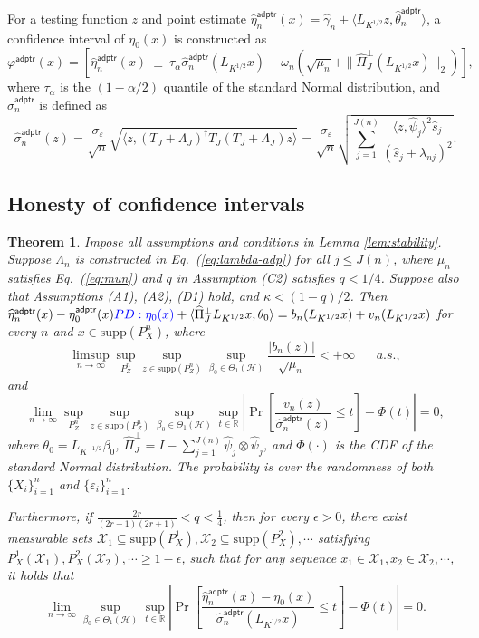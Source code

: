 \documentclass[11pt,a4paper]{article}
\renewcommand{\hat}{\widehat}
\theoremstyle{definition}
\theoremstyle{plain}
\newtheorem{theorem}{Theorem}[section]
\theoremstyle{remark}
\newcommand{\supp}{\mathrm{supp}}
\newcommand{\mX}{\mathcal X}
\newcommand{\mH}{\mathcal H}
\newcommand{\adptr}{\mathsf{adptr}}
\newcommand{\pd}[1]{
	{ \color{blue} PD: #1}
}
\begin{document}
For a testing function $z$ and point estimate $\hat\eta_n^\adptr(x)=\hat\gamma_n+\langle L_{K^{1/2}}z,\hat\theta_n^\adptr\rangle$, a confidence interval of $\eta_0(x)$ is constructed as
$$
\varphi^\adptr(x) = [\hat\eta_n^\adptr(x)\;\pm\;\tau_{\alpha}\hat\sigma_n^\adptr(L_{K^{1/2}}x)+\omega_n(\sqrt{\mu_n}+\|\hat\Pi_J^\perp(L_{K^{1/2}}x)\|_2)],
$$
where $\tau_{\alpha}$ is the $(1-\alpha/2)$ quantile of the standard Normal distribution, and $\hat\sigma_n^\adptr$ is defined as
$$
\hat\sigma_n^\adptr(z) =  \frac{\sigma_\varepsilon}{\sqrt{n}}\sqrt{\langle z, (T_J+\Lambda_J)^\dagger T_J(T_J+\Lambda_J)z\rangle} = \frac{\sigma_\varepsilon}{\sqrt{n}}\sqrt{\sum_{j=1}^{J(n)}\frac{\langle z,\hat\psi_j\rangle^2\hat s_j}{(\hat s_j+\lambda_{nj})^2}}.
$$

\subsection{Honesty of confidence intervals}

\begin{theorem}
Impose all assumptions and conditions in Lemma \ref{lem:stability}. Suppose $\Lambda_n$ is constructed in Eq.~(\ref{eq:lambda-adp}) for all $j\leq J(n)$,
where $\mu_n$ satisfies Eq.~(\ref{eq:mun}) and $q$ in Assumption (C2) satisfies $q<1/4$. Suppose also that Assumptions (A1), (A2), (D1) hold, and $\kappa<(1-q)/2$. Then 
$\hat\eta_n^\adptr(x)-\eta_0^\adptr(x) \pd{\eta_0(x)}+\langle\hat\Pi_J^\perp L_{K^{1/2}}x,\theta_0\rangle = b_n(L_{K^{1/2}}x)+v_n(L_{K^{1/2}}x)$ for every $n$ and $x\in\supp(P_X^n)$, where
$$
\limsup_{n\to\infty}\sup_{P_Z^n}\sup_{z\in\supp(P_Z^n)}\sup_{\beta_0\in\Theta_1(\mH)} \frac{|b_n(z)|}{\sqrt{\mu_n}} < +\infty\;\;\;\;\;\;a.s.,
$$
and
$$
\lim_{n\to\infty} \sup_{P_Z^n}\sup_{z\in\supp(P_Z^n)}\sup_{\beta_0\in\Theta_1(\mH)}\sup_{t\in\mathbb R}\left|\Pr\left[\frac{v_n(z)}{\hat\sigma_n^\adptr(z)}\leq t\right] - \Phi(t)\right| = 0,
$$
where $\theta_0=L_{K^{-1/2}}\beta_0$, $\hat\Pi_J^\perp = I - \sum_{j=1}^{J(n)}\hat\psi_j\otimes\hat\psi_j$, and $\Phi(\cdot)$ is the CDF of the standard Normal distribution.
The probability is over the randomness of both $\{X_i\}_{i=1}^n$ and $\{\varepsilon_i\}_{i=1}^n$. 

Furthermore, if $\frac{2r}{(2r-1)(2r+1)}<q<\frac{1}{4}$, then for every $\epsilon>0$, there exist measurable sets $\mX_1\subseteq\supp(P_X^1),\mX_2\subseteq\supp(P_X^2),\cdots$ satisfying $P_X^1(\mX_1),P_X^2(\mX_2),\cdots\geq 1-\epsilon$,
such that for any sequence $x_1\in\mX_1,x_2\in\mX_2,\cdots$, it holds that
$$
\lim_{n\to\infty} \sup_{\beta_0\in\Theta_1(\mH)}\sup_{t\in\mathbb R}\left|\Pr\left[\frac{\hat\eta_n^\adptr(x)-\eta_0(x)}{\hat\sigma_n^\adptr(L_{K^{1/2}}x)}\leq t\right] - \Phi(t)\right| = 0.
$$
%
\label{thm:adptr-limiting}
\end{theorem}
\end{document}

